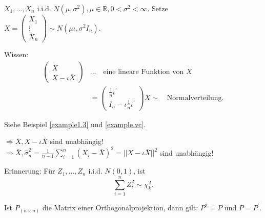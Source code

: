 \documentclass{tstextbook}
\newcommand{\R}{\mathbb R}
\begin{document}
\begin{example}
	$ X_1, \ldots, X_n $ i.i.d. $ N(\mu, \sigma^2), \mu \in \R, 0 < \sigma^2 < \infty $.
	Setze $ X = \begin{pmatrix}
		X_1 \\ \vdots \\ X_n
	\end{pmatrix} \sim N(\mu\iota, \sigma^2 I_n) $.

	Wissen:  
	\[
	\begin{aligned}
	\begin{pmatrix}
		\bar{X} \\ X- \iota \bar{X}
	\end{pmatrix} & \ldots \quad \text{eine lineare Funktion von } X \\
	& = \begin{pmatrix}
		\frac{1}{n} \iota^\prime \\ I_n - \iota \frac{1}{n} \iota^\prime
	\end{pmatrix} X \sim \quad \text{Normalverteilung.}
	\end{aligned}
	\] 
	
	Siehe Beispiel \href{example1.3}{\ref{example1.3}} und \href{example.vc}{\ref{example.vc}}.
	
	$ \Rightarrow \bar{X}, X-\iota\bar{X} $ sind unabhängig!\\
	$ \Rightarrow \bar{X}, \hat{\sigma}_n^2 = \frac{1}{n-1} \sum_{i=1}^{n} (X_i-\bar{X})^2 =  ||X-\iota\bar{X}||^2 $ sind unabhängig!
\end{example}

\begin{remark}
	Erinnerung: Für $ Z_1, \ldots, Z_n $ i.i.d. $ N(0,1) $, ist 
	\[
	\sum_{i=1}^{n} Z_i^2 \sim \chi_k^2.
	\]
\end{remark}
\begin{lemma}
	
	Ist $ P_{(n \times n)} $ die Matrix einer Orthogonalprojektion, dann gilt: $ P^2=P $  und $ P=P^\prime $.
\end{lemma}
\end{document}
